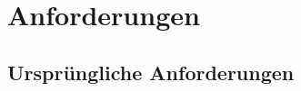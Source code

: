 
\chapter{Anforderungen} %

\label{anhangA} %


\section{Ursprüngliche Anforderungen}
\label{uanforderungen}
